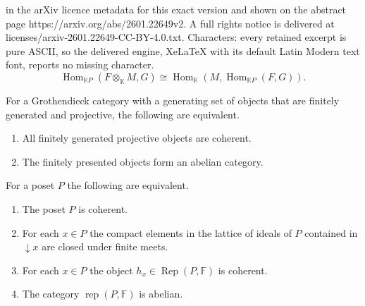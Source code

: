 \documentclass[10pt,a4paper]{amsart}
\def\bbF{\mathbb F}
\def\bbK{\mathbb K}
\newcommand{\Hom}{\operatorname{Hom}}
\newcommand{\Rep}{\operatorname{Rep}}
\newcommand{\rep}{\operatorname{rep}}
\begin{document}
in the arXiv licence metadata for this exact version and shown on the abstract page https://arxiv.org/abs/2601.22649v2. A full rights notice is delivered at licenses/arxiv-2601.22649-CC-BY-4.0.txt. Characters: every retained excerpt is pure ASCII, so the delivered engine, XeLaTeX with its default Latin Modern text font, reports no missing character.
\begin{equation}\label{eq:tensor}
  \Hom_{\bbK P}(F\otimes_\bbK M,G)\cong\Hom_{\bbK}(M,\Hom_{\bbK
    P}(F,G)).
\end{equation}

\begin{lem}\label{le:mod-coherent}
 For a Grothendieck category with a generating set of objects that are
  finitely generated and projective, the following  are equivalent.
  \begin{enumerate}
\item All finitely generated projective objects are coherent.
\item The finitely presented objects form an abelian category.
 \end{enumerate}
\end{lem}

\begin{prop}\label{pr:coherent}
  For a poset $P$ the following are equivalent.
\begin{enumerate}
\item The poset $P$ is coherent.
\item For each $x\in P$ the compact elements in the lattice of ideals
  of $P$ contained in $\downarrow\! x$ are closed under finite meets.
\item For each $x\in P$ the object $h_x\in\Rep(P,\bbF)$ is coherent.
\item The category $\rep(P,\bbF)$ is abelian.
\end{enumerate}
\end{prop}
\end{document}
